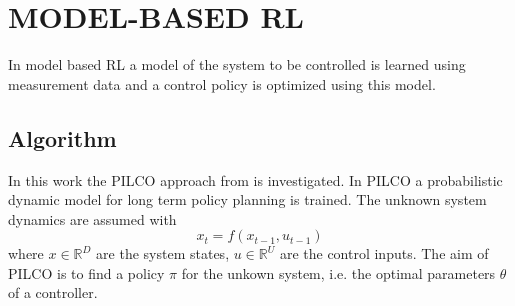 \documentclass[letterpaper, 10 pt, conference]{ieeeconf}  %
\begin{document}
\section{MODEL-BASED RL}
In model based RL a model of the system to be controlled is learned using measurement data and a control policy is optimized using this model.


\subsection{Algorithm}
In this work the PILCO %
approach %
from \cite{PILCO_paper} is investigated. %
In PILCO a probabilistic dynamic model for long term policy planning is trained. The unknown system dynamics are assumed with 
\begin{equation}\label{PILCO_sysEq}
x_t = f\left(x_{t-1},u_{t-1}\right)
\end{equation}
where $x\in \mathbb{R}^D$ are the
system states, $u \in \mathbb{R}^U$ are the control inputs. The aim of PILCO is to find a policy $\pi$ for the unkown system, i.e. the optimal parameters $\theta$ of a controller.%
\end{document}
